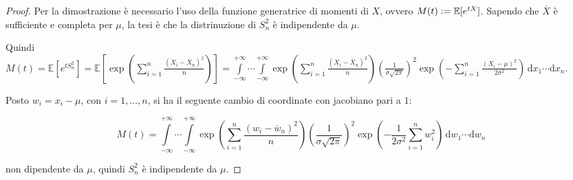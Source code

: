 \documentclass[hidelinks, 10pt]{report}
\begin{document}
\begin{proof}
Per la dimostrazione \`e necessario l'uso della funzione generatrice di momenti di $ X $, ovvero $ M(t) \vcentcolon= \mathbb{E} [e^{t X}] $. Sapendo che $ \overline{X} $ \`e sufficiente e completa per $ \mu $, la tesi \`e che la distrinuzione di $ S^{2}_{n} $ \`e indipendente da $ \mu $.

Quindi $ M(t) = \mathbb{E} \left[ e^{t S^{2}_{n}} \right] = \mathbb{E} \left[ \exp \left( \sum\limits_{i = 1}^{n} \frac{(X_i - \overline{X}_n)^2}{n} \right) \right] = \int\limits_{-\infty}^{+\infty} \dotsi \int\limits_{-\infty}^{+\infty} \exp \left( \sum\limits_{i = 1}^{n} \frac{(X_i - \overline{X}_n)^2}{n} \right) \left( \frac{1}{\sigma \sqrt{2 \pi}} \right)^2 \exp \left( - \sum\limits_{i = 1}^{n} \frac{(X_i - \mu)^2}{2 \sigma^2} \right) \, \mathrm{d}x_1 \dotsi \mathrm{d}x_n $.

Posto $ w_i = x_i - \mu $, con $ i = 1, \dotsc, n $, si ha il seguente cambio di coordinate con jacobiano pari a $ 1 $:

\[ M(t) = \int\limits_{-\infty}^{+\infty} \dotsi \int\limits_{-\infty}^{+\infty} \exp \left( \sum\limits_{i = 1}^{n} \frac{(w_i - \overline{w}_n)^2}{n} \right) \left( \frac{1}{\sigma \sqrt{2 \pi}} \right)^2 \exp \left( - \frac{1}{2 \sigma^2} \sum\limits_{i = 1}^{n} w_i^2 \right) \, \mathrm{d}w_1 \dotsi \mathrm{d}w_n \]

non dipendente da $ \mu $, quindi $ S^{2}_{n} $ \`e indipendente da $ \mu $.
\end{proof}
\end{document}
